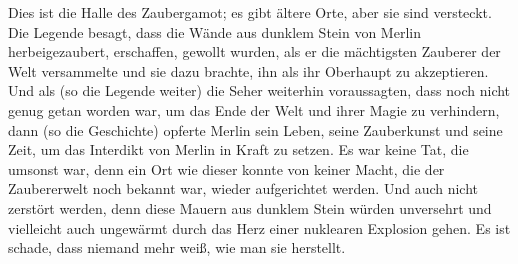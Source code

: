 Dies ist die Halle des Zaubergamot; es gibt ältere Orte, aber sie sind versteckt. Die Legende besagt, dass die Wände aus dunklem Stein von Merlin herbeigezaubert, erschaffen, gewollt wurden, als er die mächtigsten Zauberer der Welt versammelte und sie dazu brachte, ihn als ihr Oberhaupt zu akzeptieren. Und als (so die Legende weiter) die Seher weiterhin voraussagten, dass noch nicht genug getan worden war, um das Ende der Welt und ihrer Magie zu verhindern, dann (so die Geschichte) opferte Merlin sein Leben, seine Zauberkunst und seine Zeit, um das Interdikt von Merlin in Kraft zu setzen. Es war keine Tat, die umsonst war, denn ein Ort wie dieser konnte von keiner Macht, die der Zaubererwelt noch bekannt war, wieder aufgerichtet werden. Und auch nicht zerstört werden, denn diese Mauern aus dunklem Stein würden unversehrt und vielleicht auch ungewärmt durch das Herz einer nuklearen Explosion gehen. Es ist schade, dass niemand mehr weiß, wie man sie herstellt.

